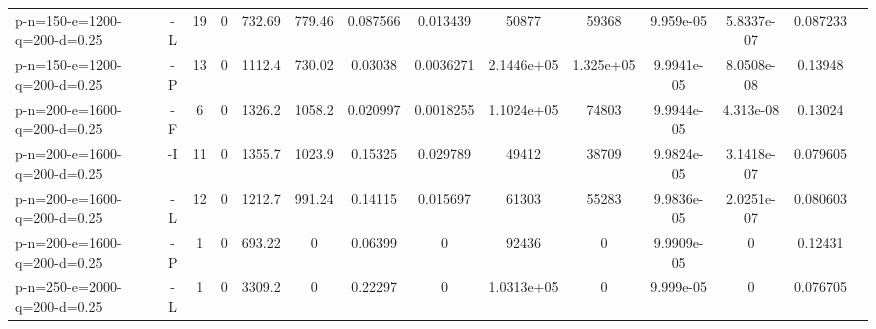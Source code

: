 \documentclass[landscape, a4paper]{article}
\begin{document}
\begin{center}
\begin{tabular}{lccccccccccccc}
p-n=150-e=1200-q=200-d=0.25 & -L & 19 & 0 & 732.69 & 779.46 & 0.087566 & 0.013439 & 50877 & 59368 & 9.959e-05 & 5.8337e-07 & 0.087233 & \\
p-n=150-e=1200-q=200-d=0.25 & -P & 13 & 0 & 1112.4 & 730.02 & 0.03038 & 0.0036271 & 2.1446e+05 & 1.325e+05 & 9.9941e-05 & 8.0508e-08 & 0.13948 & \\
p-n=200-e=1600-q=200-d=0.25 & -F & 6 & 0 & 1326.2 & 1058.2 & 0.020997 & 0.0018255 & 1.1024e+05 & 74803 & 9.9944e-05 & 4.313e-08 & 0.13024 & \\
p-n=200-e=1600-q=200-d=0.25 & -I & 11 & 0 & 1355.7 & 1023.9 & 0.15325 & 0.029789 & 49412 & 38709 & 9.9824e-05 & 3.1418e-07 & 0.079605 & \\
p-n=200-e=1600-q=200-d=0.25 & -L & 12 & 0 & 1212.7 & 991.24 & 0.14115 & 0.015697 & 61303 & 55283 & 9.9836e-05 & 2.0251e-07 & 0.080603 & \\
p-n=200-e=1600-q=200-d=0.25 & -P & 1 & 0 & 693.22 & 0 & 0.06399 & 0 & 92436 & 0 & 9.9909e-05 & 0 & 0.12431 & \\
p-n=250-e=2000-q=200-d=0.25 & -L & 1 & 0 & 3309.2 & 0 & 0.22297 & 0 & 1.0313e+05 & 0 & 9.999e-05 & 0 & 0.076705 & \\
\end{tabular}
\end{center}
\end{document}
